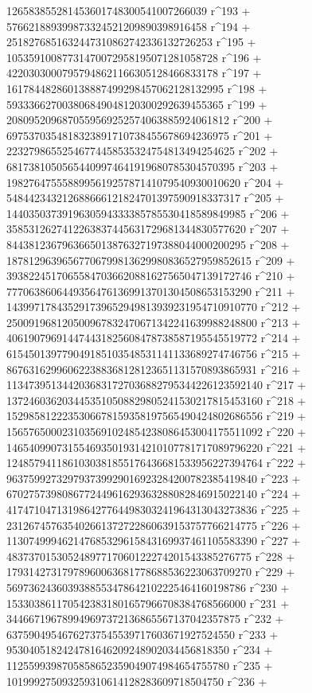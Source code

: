        126583855281453601748300541007266039 r^193 + 
       576621889399873324521209890398916458 r^194 + 
       2518276851632447310862742336132726253 r^195 + 
       10535910087731470072958195071281058728 r^196 + 
       42203030007957948621166305128466833178 r^197 + 
       161784482860138887499298457062128132995 r^198 + 
       593336627003806849048120300292639455365 r^199 + 
       2080952096870559569252574063885924061812 r^200 + 
       6975370354818323891710738455678694236975 r^201 + 
       22327986552546774458535324754813494254625 r^202 + 
       68173810505654409974641919680785304570395 r^203 + 
       198276475558899561925787141079540930010620 r^204 + 
       548442343212688666121824701397590918337317 r^205 + 
       1440350373919630594333385785530418589849985 r^206 + 
       3585312627412263837445631729681344830577620 r^207 + 
       8443812367963665013876327197388044000200295 r^208 + 
       18781296396567706799813629980836527959852615 r^209 + 
       39382245170655847036620881627565047139172746 r^210 + 
       77706386064493564761369913701304508653153290 r^211 + 
       143997178435291739652949813939231954710910770 r^212 + 
       250091968120500967832470671342241639988248800 r^213 + 
       406190796914474431825608478738587195545519772 r^214 + 
       615450139779049185103548531141133689274746756 r^215 + 
       867631629960622388368128123651131570893865931 r^216 + 
       1134739513442036831727036882795344226123592140 r^217 + 
       1372460362034453510508829805241530217815453160 r^218 + 
       1529858122235306678159358197565490424802686556 r^219 + 
       1565765000231035691024854238086453004175511092 r^220 + 
       1465409907315546935019314210107781717089796220 r^221 + 
       1248579411861030381855176436681533956227394764 r^222 + 
       963759927329793739929016923284200782385419840 r^223 + 
       670275739808677244961629363288082846915022140 r^224 + 
       417471047131986427764498303241964313043273836 r^225 + 
       231267457635402661372722860639153757766214775 r^226 + 
       113074999462147685329615843169937461105583390 r^227 + 
       48373701530524897717060122274201543385276775 r^228 + 
       17931427317978960063681778688536223063709270 r^229 + 
       5697362436039388553478642102225464160198786 r^230 + 
       1533038611705423831801657966708384768566000 r^231 + 
       344667196789949697372136865567137042357875 r^232 + 
       63759049546762737545539717603671927524550 r^233 + 
       9530405182424781646209248902034456818350 r^234 + 
       1125599398705858652359049074984654755780 r^235 + 
       101999275093259310614128283609718504750 r^236 + 
